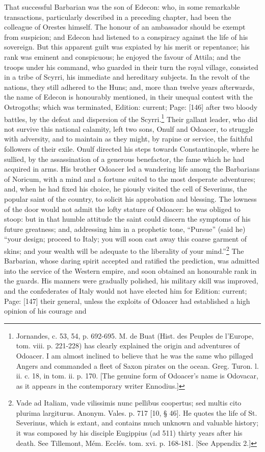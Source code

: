 That successful Barbarian was the son of Edecon: who, in some remarkable transactions, particularly described in a preceding chapter, had been the colleague of Orestes himself. The honour of an ambassador should be exempt from suspicion; and Edecon had listened to a conspiracy against the life of his sovereign. But this apparent guilt was expiated by his merit or repentance; his rank was eminent and conspicuous; he enjoyed the favour of Attila; and the troops under his command, who guarded in their turn the royal village, consisted in a tribe of Scyrri, his immediate and hereditary subjects. In the revolt of the nations, they still adhered to the Huns; and, more than twelve years afterwards, the name of Edecon is honourably mentioned, in their unequal contest with the Ostrogoths; which was terminated, Edition: current; Page: [146] after two bloody battles, by the defeat and dispersion of the Scyrri.\footnote{Jornandes, c. 53, 54, p. 692-695. M. de Buat (Hist. des Peuples de l\texthebrew{}’Europe, tom. viii. p. 221-228) has clearly explained the origin and adventures of Odoacer. I am almost inclined to believe that he was the same who pillaged Angers and commanded a fleet of Saxon pirates on the ocean. Greg. Turon. l. ii. c. 18, in tom. ii. p. 170. [The genuine form of Odoacer\texthebrew{}’s name is Odovacar, as it appears in the contemporary writer Ennodius.]} Their gallant leader, who did not survive this national calamity, left two sons, Onulf and Odoacer, to struggle with adversity, and to maintain as they might, by rapine or service, the faithful followers of their exile. Onulf directed his steps towards Constantinople, where he sullied, by the assassination of a generous benefactor, the fame which he had acquired in arms. His brother Odoacer led a wandering life among the Barbarians of Noricum, with a mind and a fortune suited to the most desperate adventures; and, when he had fixed his choice, he piously visited the cell of Severinus, the popular saint of the country, to solicit his approbation and blessing. The lowness of the door would not admit the lofty stature of Odoacer: he was obliged to stoop: but in that humble attitude the saint could discern the symptoms of his future greatness; and, addressing him in a prophetic tone, \texthebrew{“}Pursue\texthebrew{}” (said he) \texthebrew{“}your design; proceed to Italy; you will soon cast away this coarse garment of skins; and your wealth will be adequate to the liberality of your mind.\texthebrew{}”\footnote{Vade ad Italiam, vade vilissimis nunc pellibus coopertus; sed multis cito plurima largiturus. Anonym. Vales. p. 717 [10, § 46]. He quotes the life of St. Severinus, which is extant, and contains much unknown and valuable history; it was composed by his disciple Eugippius (ad 511) thirty years after his death. See Tillemont, Mém. Ecclés. tom. xvi. p. 168-181. [See Appendix 2.]} The Barbarian, whose daring spirit accepted and ratified the prediction, was admitted into the service of the Western empire, and soon obtained an honourable rank in the guards. His manners were gradually polished, his military skill was improved, and the confederates of Italy would not have elected him for Edition: current; Page: [147] their general, unless the exploits of Odoacer had established a high opinion of his courage and 